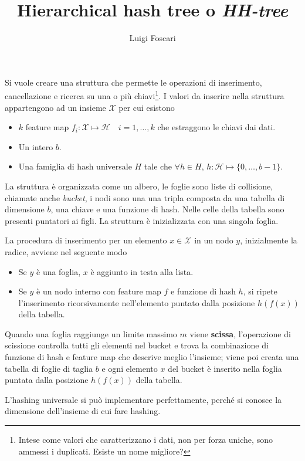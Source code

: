 \documentclass[a4paper]{article}
\title{Hierarchical hash tree o \textit{HH-tree}}
\author{Luigi Foscari}
\date{}
\begin{document}
\maketitle

Si vuole creare una struttura che permette le operazioni di inserimento, cancellazione e ricerca su una o più chiavi\footnote{Intese come valori che caratterizzano i dati, non per forza uniche, sono ammessi i duplicati. Esiste un nome migliore?}. I valori da inserire nella struttura appartengono ad un insieme $\mathcal{X}$ per cui esistono
\begin{itemize}
	\item $k$ feature map $f_i: \mathcal{X} \mapsto \mathcal{H} \quad i=1,\ldots,k$ che estraggono le chiavi dai dati.
	\item Un intero $b$.
	\item Una famiglia di hash universale $H$ tale che $\forall h \in H$, $h: \mathcal{H} \mapsto \{ 0, \ldots, b - 1 \}$.
\end{itemize}

La struttura è organizzata come un albero, le foglie sono liste di collisione, chiamate anche \textit{bucket}, i nodi sono una una tripla composta da una tabella di dimensione $b$, una chiave e una funzione di hash. Nelle celle della tabella sono presenti puntatori ai figli. La struttura è inizializzata con una singola foglia.

La procedura di inserimento per un elemento $x \in \mathcal{X}$ in un nodo $y$, inizialmente la radice, avviene nel seguente modo
\begin{itemize}
	\item Se $y$ è una foglia, $x$ è aggiunto in testa alla lista.
	\item Se $y$ è un nodo interno con feature map $f$ e funzione di hash $h$, si ripete l'inserimento ricorsivamente nell'elemento puntato dalla posizione $h(f(x))$ della tabella.
\end{itemize}

Quando una foglia raggiunge un limite massimo $m$ viene \textbf{scissa}, l'operazione di scissione controlla tutti gli elementi nel bucket e trova la combinazione di funzione di hash e feature map che descrive meglio l'insieme; viene poi creata una tabella di foglie di taglia $b$ e ogni elemento $x$ del bucket è inserito nella foglia puntata dalla posizione $h(f(x))$ della tabella.

L'hashing universale si può implementare perfettamente, perché si conosce la dimensione dell'insieme di cui fare hashing.
\end{document}
